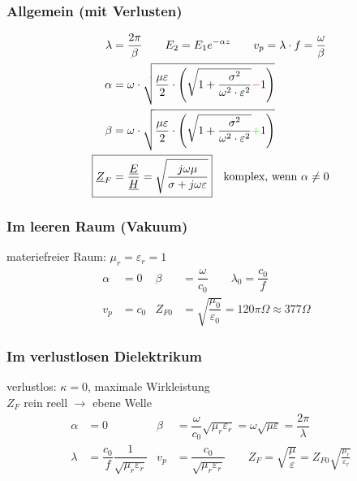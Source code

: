 \subsubsection{Allgemein (mit Verlusten)}
\begin{align*}
    \lambda                 & = \dfrac{2\pi}{\beta} \qquad E_2 = E_1 e^{-\alpha z}         \qquad                                                                            
    v_p                      = \lambda\cdot f = \dfrac{\omega}{\beta}                                                                                                    \\
    \alpha                  & = \omega \cdot \sqrt{\dfrac{\mu \varepsilon}{2}\cdot \left(\sqrt{1+\dfrac{\sigma^2}{\omega^2\cdot\varepsilon^2}}{\color{red}{-}}1\right)}   \\
    \beta                   & = \omega \cdot \sqrt{\dfrac{\mu \varepsilon}{2}\cdot \left(\sqrt{1+\dfrac{\sigma^2}{\omega^2\cdot\varepsilon^2}}{\color{green}{+}}1\right)} \\
    \Aboxed{\underline{Z}_F & = \dfrac{\underline{E}}{\underline{H}} = \sqrt{\dfrac{j\omega\mu}{\sigma+j\omega\varepsilon}}}\quad\text{komplex, wenn } \alpha \neq 0
\end{align*}

\subsubsection{Im leeren Raum (Vakuum)}
materiefreier Raum: $ \mu_r = \varepsilon_r = 1 $
\begin{align*}
    \alpha                     & = 0 &
    \beta                      & = \dfrac{\omega}{c_0} \qquad 
    \lambda_0                   = \dfrac{c_0}{f} \\
    v_p                        & = c_0 &
Z_{F0} & = \sqrt{\dfrac{\mu_0}{\varepsilon_0}} = 120 \pi\Omega\approx377\Omega &
\end{align*}
\subsubsection{Im verlustlosen Dielektrikum}
verlustlos: $\kappa =0$, maximale Wirkleistung\\
$Z_F$ rein reell $\rightarrow$ ebene Welle
\begin{align*}
    \alpha                  & = 0 &
    \beta                   & = \dfrac{\omega}{c_0}\sqrt{\mu_r\varepsilon_r}=\omega\sqrt{\mu\varepsilon}=\dfrac{2\pi}{\lambda} \\
    \lambda                 & = \dfrac{c_0}{f}\dfrac{1}{\sqrt{\mu_r\varepsilon_r}} &
    v_p                     & = \dfrac{c_0}{\sqrt{\mu_r\varepsilon_r}}         \qquad
    \boxed{Z_F = \sqrt{\dfrac{\mu}{\varepsilon}}=Z_{F0}\sqrt{\frac{\mu_r}{\varepsilon_r}}}
\end{align*}

